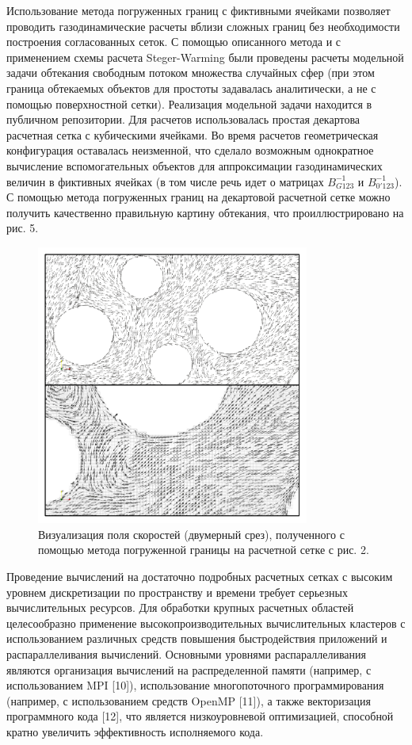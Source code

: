 Использование метода погруженных границ с фиктивными ячейками позволяет проводить газодинамические расчеты вблизи сложных границ без необходимости построения согласованных сеток.
С помощью описанного метода и с применением схемы расчета Steger-Warming были проведены расчеты модельной задачи обтекания свободным потоком множества случайных сфер (при этом граница обтекаемых объектов для простоты задавалась аналитически, а не с помощью поверхностной сетки).
Реализация модельной задачи находится в публичном репозитории.
Для расчетов использовалась простая декартова расчетная сетка с кубическими ячейками.
Во время расчетов геометрическая конфигурация оставалась неизменной, что сделало возможным однократное вычисление вспомогательных объектов для аппроксимации газодинамических величин в фиктивных ячейках (в том числе речь идет о матрицах $B_{G123}^{-1}$ и $B_{0'123}^{-1}$).
С помощью метода погруженных границ на декартовой расчетной сетке можно получить качественно правильную картину обтекания, что проиллюстрировано на рис. 5.

\begin{figure}[ht]
	\centering
	\includegraphics[width=0.8\textwidth]{./pics/text_4_ibm/res.pdf}
	\caption{Визуализация поля скоростей (двумерный срез), полученного с помощью метода погруженной границы на расчетной сетке с рис. 2.}
	\label{fig:text_4_ibm_res}
\end{figure}

Проведение вычислений на достаточно подробных расчетных сетках с высоким уровнем дискретизации по пространству и времени требует серьезных вычислительных ресурсов.
Для обработки крупных расчетных областей целесообразно применение высокопроизводительных вычислительных кластеров с использованием различных средств повышения быстродействия приложений и распараллеливания вычислений.
Основными уровнями распараллеливания являются организация вычислений на распределенной памяти (например, с использованием MPI [10]), использование многопоточного программирования (например, с использованием средств OpenMP [11]), а также векторизация программного кода [12], что является низкоуровневой оптимизацией, способной кратно увеличить эффективность исполняемого кода.


